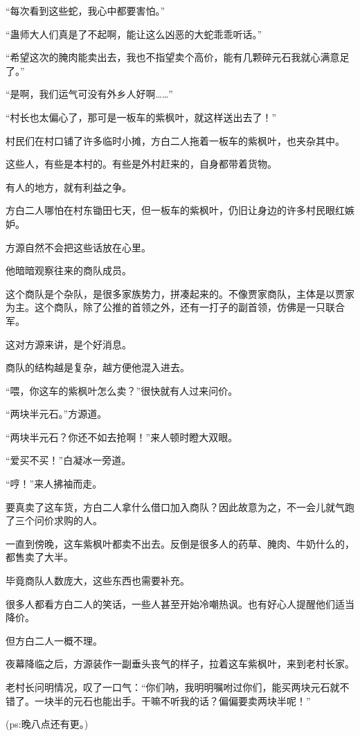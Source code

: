 \begin{this_body}
“每次看到这些蛇，我心中都要害怕。”

“蛊师大人们真是了不起啊，能让这么凶恶的大蛇乖乖听话。”

“希望这次的腌肉能卖出去，我也不指望卖个高价，能有几颗碎元石我就心满意足了。”

“是啊，我们运气可没有外乡人好啊……”

“村长也太偏心了，那可是一板车的紫枫叶，就这样送出去了！”

村民们在村口铺了许多临时小摊，方白二人拖着一板车的紫枫叶，也夹杂其中。

这些人，有些是本村的。有些是外村赶来的，自身都带着货物。

有人的地方，就有利益之争。

方白二人哪怕在村东锄田七天，但一板车的紫枫叶，仍旧让身边的许多村民眼红嫉妒。

方源自然不会把这些话放在心里。

他暗暗观察往来的商队成员。

这个商队是个杂队，是很多家族势力，拼凑起来的。不像贾家商队，主体是以贾家为主。这个商队，除了公推的首领之外，还有一打子的副首领，仿佛是一只联合军。

这对方源来讲，是个好消息。

商队的结构越是复杂，越方便他混入进去。

“喂，你这车的紫枫叶怎么卖？”很快就有人过来问价。

“两块半元石。”方源道。

“两块半元石？你还不如去抢啊！”来人顿时瞪大双眼。

“爱买不买！”白凝冰一旁道。

“哼！”来人拂袖而走。

要真卖了这车货，方白二人拿什么借口加入商队？因此故意为之，不一会儿就气跑了三个问价求购的人。

一直到傍晚，这车紫枫叶都卖不出去。反倒是很多人的药草、腌肉、牛奶什么的，都售卖了大半。

毕竟商队人数庞大，这些东西也需要补充。

很多人都看方白二人的笑话，一些人甚至开始冷嘲热讽。也有好心人提醒他们适当降价。

但方白二人一概不理。

夜幕降临之后，方源装作一副垂头丧气的样子，拉着这车紫枫叶，来到老村长家。

老村长问明情况，叹了一口气：“你们呐，我明明嘱咐过你们，能买两块元石就不错了。一块半的元石也能出手。干嘛不听我的话？偏偏要卖两块半呢！”

(ps:晚八点还有更。)

\end{this_body}

